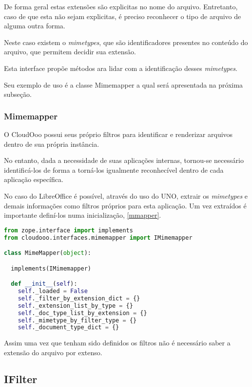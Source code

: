 De forma geral estas extensões são explicitas no nome do arquivo. Entretanto, caso de que esta não sejam explicitas, é preciso reconhecer o tipo de arquivo de alguma outra forma. 

Neste caso existem o \textit{mimetypes}, que são identificadores presentes no conteúdo do arquivo, que permitem decidir sua extensão. 

Esta interface propõe métodos ara lidar com a identificação desses \textit{mimetypes}.

Seu exemplo de uso é a classe Mimemapper a qual será apresentada na próxima subseção.


\subsubsection{Mimemapper}
\label{mimemapper}

O CloudOoo possui seus próprio filtros para identificar e renderizar arquivos dentro de sua própria instância.

No entanto, dada a necessidade de suas aplicações internas, tornou-se necessário identificá-los de forma a torná-los igualmente reconhecível dentro de cada aplicação específica.

No caso do LibreOffice é possível, através do uso do UNO, extrair os \textit{mimetypes} e demais informações como filtros próprios para  esta aplicação. Um vez extraídos é importante definí-los numa inicialização, \ref{mmapper}.

{\singlespace
\begin{lstlisting}[caption=Trecho de criação da classe Mimemapper,language=python,label={mmapper}]
from zope.interface import implements
from cloudooo.interfaces.mimemapper import IMimemapper

class MimeMapper(object):

  implements(IMimemapper)

  def __init__(self):
    self._loaded = False
    self._filter_by_extension_dict = {}
    self._extension_list_by_type = {}
    self._doc_type_list_by_extension = {}
    self._mimetype_by_filter_type = {}
    self._document_type_dict = {}
\end{lstlisting}
}

Assim uma vez que tenham sido definidos os filtros não é necessário saber a extensão do arquivo por extenso.


\subsection{IFilter}

